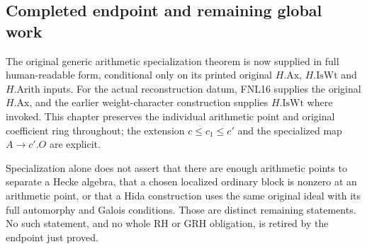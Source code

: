 \subsection{Completed endpoint and remaining global work}

The original generic arithmetic specialization
theorem is now supplied in full human-readable
form, conditional only on its printed original
$H.\mathrm{Ax}$, $H.\mathrm{IsWt}$ and
$H.\mathrm{Arith}$ inputs.  For the actual
reconstruction datum, FNL16 supplies the
original $H.\mathrm{Ax}$, and the earlier
weight-character construction supplies
$H.\mathrm{IsWt}$ where invoked.  This
chapter preserves the individual arithmetic
point and original coefficient ring throughout;
the extension $c\leq c_1\leq c'$ and the
specialized map $A\to c'.O$ are explicit.

Specialization alone does not assert that
there are enough arithmetic points to separate
a Hecke algebra, that a chosen localized
ordinary block is nonzero at an arithmetic
point, or that a Hida construction uses the
same original ideal with its full automorphy
and Galois conditions.  Those are distinct
remaining statements.  No such statement,
and no whole RH or GRH obligation, is retired
by the endpoint just proved.
